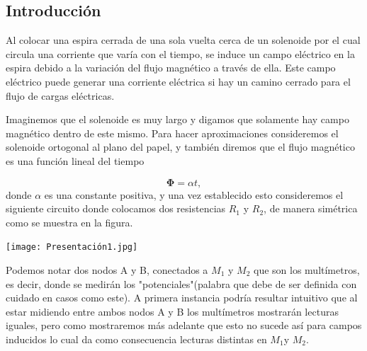 \documentclass[a0,portrait]{a0poster}
\begin{document}
\begin{multicols}{2}



\color{black} %

\section*{Introducción}
\noindent Al colocar una espira cerrada de una sola vuelta cerca de un solenoide por el cual circula una corriente que varía con el tiempo, se induce un campo eléctrico en la espira debido a la variación del flujo magnético a través de ella. Este campo eléctrico puede generar una corriente eléctrica si hay un camino cerrado para el flujo de cargas eléctricas.

\noindent Imaginemos que el solenoide es muy largo y digamos que solamente hay campo magnético dentro de este mismo. Para hacer aproximaciones consideremos el solenoide ortogonal al plano del papel, y también diremos que el flujo magnético es una función lineal del tiempo

\begin{equation}
\boldsymbol{\Phi}=\alpha t,
\label{flujo}
\end{equation}
\noindent donde $\alpha$ es una constante positiva, y una vez establecido esto consideremos el siguiente circuito donde colocamos dos resistencias $R_1$  y $R_2$, de manera simétrica como se muestra en la figura.

\begin{center}\vspace{0.4cm}
    \texttt{[image: Presentación1.jpg]}
\end{center}\vspace{0.4cm}
Podemos notar dos nodos A y B, conectados a $M_{1}$ y $M_{2}$ que son los multímetros, es decir, donde se medirán los "potenciales"(palabra que debe de ser definida con cuidado en casos como este). A primera instancia podría resultar intuitivo que al estar midiendo entre ambos nodos A y B los multímetros mostrarán lecturas iguales, pero como  mostraremos más adelante que esto no sucede así para campos inducidos lo cual da como consecuencia lecturas distintas en $M_{1}$y $M_{2}$.


\end{multicols}
\end{document}
